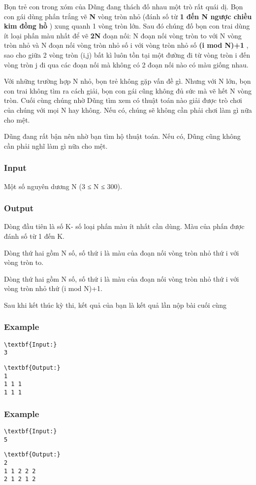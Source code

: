 



   Bọn trẻ con trong xóm của Dũng đang thách đố nhau một trò rất quái dị. Bọn con gái dùng phấn trắng vẽ   \textbf{    N   }   vòng tròn nhỏ (đánh số từ   \textbf{    1 đến N ngược chiều kim đồng hồ   }   ) xung quanh 1 vòng tròn lớn. Sau đó chúng đố bọn con trai dùng ít loại phấn màu nhất để vẽ   \textbf{    2N   }   đoạn nối: N đoạn nối vòng tròn to với N vòng tròn nhỏ và N đoạn nối vòng tròn nhỏ số i với vòng tròn nhỏ số   \textbf{    (i mod N)+1   }   , sao cho giữa 2 vòng tròn (i,j) bất kì luôn tồn tại một đường đi từ vòng tròn i đến vòng tròn j đi qua các đoạn nối mà không có 2 đoạn nối nào có màu giống nhau.  

   Với những trường hợp N nhỏ, bọn trẻ không gặp vấn đề gì. Nhưng với N lớn, bọn con trai không tìm ra cách giải, bọn con gái cũng không đủ sức mà vẽ hết N vòng tròn. Cuối cùng chúng nhờ Dũng tìm xem có thuật toán nào giải được trò chơi của chúng với mọi N hay không. Nếu có, chúng sẽ không cần phải chơi làm gì nữa cho mệt.  

   Dũng đang rất bận nên nhờ bạn tìm hộ thuật toán. Nếu có, Dũng cũng không cần phải nghĩ làm gì nữa cho mệt.  

\subsubsection{   Input  }

   Một số nguyên dương N (3 ≤ N ≤ 300).  

\subsubsection{   Output  }

   Dòng đầu tiên là số K- số loại phấn màu ít nhất cần dùng. Màu của phấn được đánh số từ 1 đến K.  

   Dòng thứ hai gồm N số, số thứ i là màu của đoạn nối vòng tròn nhỏ thứ i với vòng tròn to.  

   Dòng thứ hai gồm N số, số thứ i là màu của đoạn nối vòng tròn nhỏ thứ i với vòng tròn nhỏ thứ (i mod N)+1.  

    Sau khi kết thúc kỳ thi, kết quả của bạn là kết quả lần nộp bài cuối cùng   

\subsubsection{   Example  }
\begin{verbatim}
\textbf{Input:}
3
\end{verbatim}
\begin{verbatim}
\textbf{Output:}
1
1 1 1
1 1 1\end{verbatim}

\subsubsection{   Example  }
\begin{verbatim}
\textbf{Input:}
5
\end{verbatim}
\begin{verbatim}
\textbf{Output:}
2
1 1 2 2 2
2 1 2 1 2\end{verbatim}

